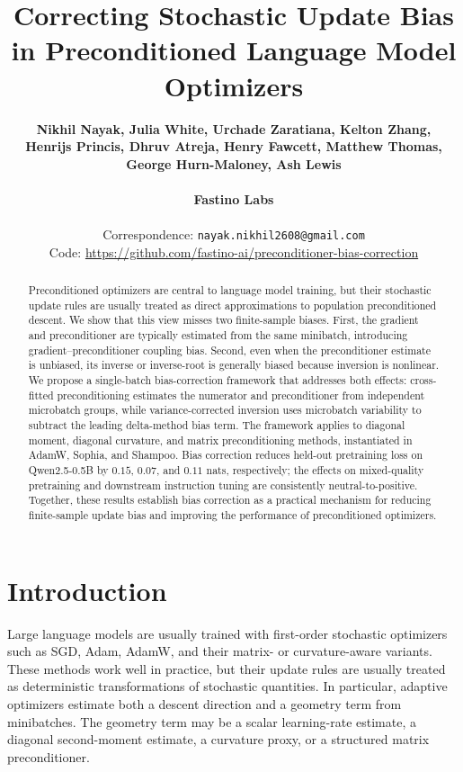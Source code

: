 \documentclass{article}
\title{Correcting Stochastic Update Bias in Preconditioned Language Model Optimizers}
\author{%
  \textbf{Nikhil Nayak, Julia White, Urchade Zaratiana, Kelton Zhang,} \\
  \textbf{Henrijs Princis, Dhruv Atreja, Henry Fawcett, Matthew Thomas,} \\
  \textbf{George Hurn-Maloney, Ash Lewis} \\~\\
  \textbf{Fastino Labs} \\~\\
  Correspondence: \texttt{nayak.nikhil2608@gmail.com} \\
  Code: \url{https://github.com/fastino-ai/preconditioner-bias-correction}
}
\begin{document}
\maketitle

\begin{abstract}
Preconditioned optimizers are central to language model training, but their stochastic update rules are usually treated as direct approximations to population preconditioned descent. We show that this view misses two finite-sample biases. First, the gradient and preconditioner are typically estimated from the same minibatch, introducing gradient--preconditioner coupling bias. Second, even when the preconditioner estimate is unbiased, its inverse or inverse-root is generally biased because inversion is nonlinear. We propose a single-batch bias-correction framework that addresses both effects: cross-fitted preconditioning estimates the numerator and preconditioner from independent microbatch groups, while variance-corrected inversion uses microbatch variability to subtract the leading delta-method bias term. The framework applies to diagonal moment, diagonal curvature, and matrix preconditioning methods, instantiated in AdamW, Sophia, and Shampoo. Bias correction reduces held-out pretraining loss on Qwen2.5-0.5B by $0.15$, $0.07$, and $0.11$ nats, respectively; the effects on mixed-quality pretraining and downstream instruction tuning are consistently neutral-to-positive. Together, these results establish bias correction as a practical mechanism for reducing finite-sample update bias and improving the performance of preconditioned optimizers.
\end{abstract}

\section{Introduction}
\label{sec:introduction}

Large language models are usually trained with first-order stochastic optimizers such as SGD, Adam, AdamW, and their matrix- or curvature-aware variants. These methods work well in practice, but their update rules are usually treated as deterministic transformations of stochastic quantities. In particular, adaptive optimizers estimate both a descent direction and a geometry term from minibatches. The geometry term may be a scalar learning-rate estimate, a diagonal second-moment estimate, a curvature proxy, or a structured matrix preconditioner.
\end{document}
